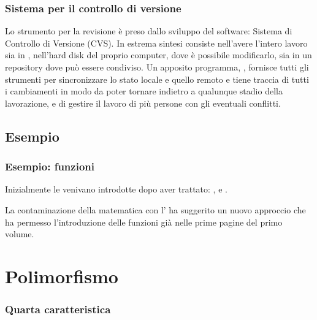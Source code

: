 \documentclass{beamer} %
\begin{document}
\begin{frame}\frametitle{Sistema per il controllo di versione}

Lo strumento per la revisione è preso dallo sviluppo del software: 
Sistema di Controllo di Versione (CVS).
\spause
In estrema sintesi consiste nell'avere l'intero lavoro sia in , 
nell'hard disk del proprio computer, dove è possibile modificarlo, sia 
in un repository  dove può essere condiviso. 
\spause
Un apposito programma, , fornisce tutti gli strumenti per 
sincronizzare lo stato locale e quello remoto e tiene traccia di tutti 
i cambiamenti in modo da poter tornare indietro a qualunque stadio della 
lavorazione, e di gestire il lavoro di più persone con gli eventuali 
conflitti.

\end{frame}


\subsection{Esempio} 

\begin{frame}\frametitle{Esempio: funzioni}

Inizialmente le  venivano introdotte dopo aver 
trattato: ,  e .

\pause
La contaminazione della matematica con l' ha suggerito 
un nuovo approccio che ha permesso l'introduzione delle funzioni 
già nelle prime pagine del primo volume.

\pause
\medskip
{}

\end{frame}


\section{Polimorfismo}


\begin{frame}\frametitle{Quarta caratteristica}

\begin{center}  \end{center}

\end{frame}
\end{document}

